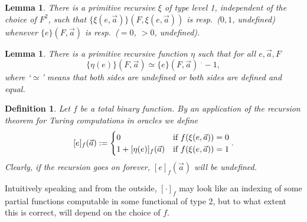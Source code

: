 \documentclass[reqno]{amsart}
\newcommand{\dminus}{\mbox{$\;^\cdot\!\!\!-$}}
\newtheorem{lem}[thm]{Lemma}
\newtheorem{defi}[thm]{Definition}
\def\({\textup{(}}
\def\){\textup{)}}
\numberwithin{equation}{section}
\numberwithin{thm}{section}
\begin{document}
\begin{lem}There is a primitive recursive $\xi$ of type level 1, independent of the choice of $F^{2}$, such that  
$\{\xi(e, \vec a)\}(F,\xi(e,\vec a))$ is resp.\ \($0, 1 $,   {\em undefined}\) whenever $\{e\}(F,\vec a)$ is resp.\ \($= 0$,  $> 0$,  {\em undefined}\). 
\end{lem}
\begin{lem}
There is a primitive recursive function $\eta$ such that for all $e,\vec a, F$
\[
\{\eta(e)\}(F,\vec a) \simeq \{e\}(F,\vec a) \dminus 1,
\]
where `$\simeq$' means that both sides are undefined or both sides are defined and equal.
\end{lem}
\begin{defi}\rm
Let $f$ be a total binary function. By an application of the recursion theorem for Turing computations in oracles we define
\[
[e]_f(\vec a) := 
\begin{cases} 
0& \textup{if $f(\xi(e,\vec a)) = 0$} \\ 
1 + [\eta(e)]_f(\vec a)&\textup{if $f(\xi(e,\vec a)) = 1$}
\end{cases}.
\]
Clearly, if the recursion goes on forever, $[e]_f(\vec a)$ will be undefined. 
\end{defi}
Intuitively speaking and from the outside, $[ \cdot]_f$ may look like an indexing of some  partial functions computable in some functional of type 2, but to what extent this is correct, will depend on the choice of $f$. 

\smallskip
\end{document}
